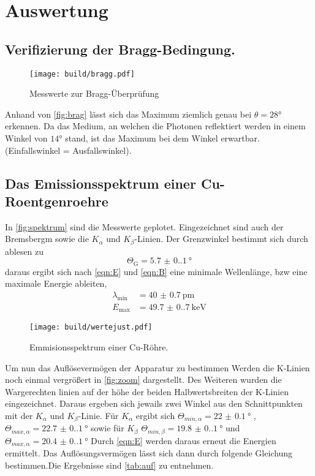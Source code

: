 \section{Auswertung}
\label{sec:Auswertung}

\subsection{Verifizierung der Bragg-Bedingung.}
\begin{figure}
    \centering
    \caption{Messwerte zur Bragg-Überprüfung}
    \label{fig:brag}
    \texttt{[image: build/bragg.pdf]}
\end{figure}
Anhand von \autoref{fig:brag} lässt sich das Maximum ziemlich genau bei 
$\theta = 28\unit{\degree}$ erkennen. Da das Medium, an welchen 
die Photonen reflektiert werden in einem Winkel von $14\unit{\degree}$ stand, 
ist das Maximum bei dem Winkel erwartbar. (Einfallswinkel = Ausfallswinkel).

\subsection{Das Emissionsspektrum einer Cu-Roentgenroehre}
In \autoref{fig:spektrum} sind die Messwerte geplotet. Eingezeichnet sind auch der Bremsbergm sowie die $K_\alpha $ und $K_\beta $-Linien.
Der Grenzwinkel bestimmt sich durch ablesen zu 
\begin{equation}
    \Theta_\text{G} = \qty{5.7(0.1)}{\degree}
\end{equation}
daraus ergibt sich nach \autoref{eqn:E} und \autoref{eqn:B}
eine minimale Wellenlänge, bzw eine maximale Energie ableiten,
 \begin{align}
    \lambda_\text{min} &= \qty{40(0.7)}{\pico\meter}\\
    E_\text{max} &= \qty{49.7(0.7)}{\kilo\electronvolt}
 \end{align}
\begin{figure}
    \centering
    \caption{Emmisionsspektrum einer Cu-Röhre.}
    \label{fig:spektrum}
    \texttt{[image: build/wertejust.pdf]}
\end{figure}
Um nun das Auflösevermögen der Apparatur zu bestimmen Werden die K-Linien noch einmal 
vergrößert in \autoref{fig:zoom} dargestellt. Des Weiteren wurden die Wargerechten linien 
auf der höhe der beiden Halbwertsbreiten der K-Linien eingezeichnet. Daraus ergeben sich jewails zwei 
Winkel aus den Schnittpunkten mit der $K_\alpha$ und $K_\beta$-Linie.
Für $K_\alpha$ ergibt sich $\Theta_{min,\alpha} = \qty{22(0.1)}{\degree}$ 
, $\Theta_{max,\alpha} = \qty{22.7(0.1)}{\degree}$ sowie für $K_\beta
$ $\Theta_{min,\beta} = \qty{19.8(0.1)}{\degree}$ und $\Theta_{max,\alpha} = \qty{20.4(0.1)}{\degree}$
Durch \autoref{eqn:E} werden daraus erneut die Energien ermittelt. Das Auflösungsvermögen lässt sich dann 
durch folgende Gleichung bestimmen.Die Ergebnisse sind \autoref{tab:auf} zu entnehmen.

